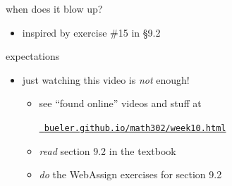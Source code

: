 \documentclass[urlcolor=blue,dvipsnames]{beamer}
\begin{document}
\begin{frame}{when does it blow up?}

\begin{itemize}
\item inspired by exercise \#15 in \S9.2
\end{itemize}
\end{frame}


\begin{frame}{expectations}

\begin{itemize}
\item just watching this video is \emph{not} enough!
     \begin{itemize}
     \item see ``found online'' videos and stuff at

     \centerline{\href{https://bueler.github.io/math302/week10.html}{\tt \color{cyan} bueler.github.io/math302/week10.html}}
     \item \emph{read} section 9.2 in the textbook
     \item \emph{do} the WebAssign exercises for section 9.2
     \end{itemize}
\end{itemize}
\end{frame}
\end{document}
